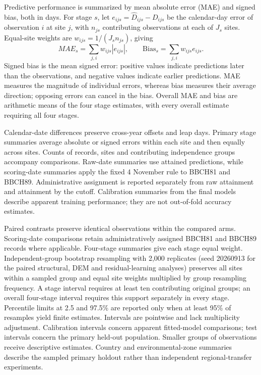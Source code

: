 \documentclass[a4paper,12pt]{article}
\begin{document}
Predictive performance is summarized by mean absolute error (MAE) and signed bias, both in days. For stage $s$, let $e_{ijs}=\widehat D_{ijs}-D_{ijs}$ be the calendar-day error of observation $i$ at site $j$, with $n_{js}$ contributing observations at each of $J_s$ sites. Equal-site weights are $w_{ijs}=1/(J_s n_{js})$, giving
\begin{equation}
MAE_s=\sum_{j,i}w_{ijs}|e_{ijs}|,\qquad
\mathrm{Bias}_s=\sum_{j,i}w_{ijs}e_{ijs}.
\label{eq:performance_metrics}
\end{equation}
Signed bias is the mean signed error: positive values indicate predictions later than the observations, and negative values indicate earlier predictions. MAE measures the magnitude of individual errors, whereas bias measures their average direction; opposing errors can cancel in the bias. Overall MAE and bias are arithmetic means of the four stage estimates, with every overall estimate requiring all four stages.

Calendar-date differences preserve cross-year offsets and leap days. Primary stage summaries average absolute or signed errors within each site and then equally across sites. Counts of records, sites and contributing independence groups accompany comparisons. Raw-date summaries use attained predictions, while scoring-date summaries apply the fixed 4 November rule to BBCH81 and BBCH89. Administrative assignment is reported separately from raw attainment and attainment by the cutoff. Calibration summaries from the final models describe apparent training performance; they are not out-of-fold accuracy estimates.

Paired contrasts preserve identical observations within the compared arms. Scoring-date comparisons retain administratively assigned BBCH81 and BBCH89 records where applicable. Four-stage summaries give each stage equal weight. Independent-group bootstrap resampling with 2,000 replicates (seed 20260913 for the paired structural, DEM and residual-learning analyses) preserves all sites within a sampled group and equal site weights multiplied by group resampling frequency. A stage interval requires at least ten contributing original groups; an overall four-stage interval requires this support separately in every stage. Percentile limits at 2.5 and 97.5\% are reported only when at least 95\% of resamples yield finite estimates. Intervals are pointwise and lack multiplicity adjustment. Calibration intervals concern apparent fitted-model comparisons; test intervals concern the primary held-out population. Smaller groups of observations receive descriptive estimates. Country and environmental-zone summaries describe the sampled primary holdout rather than independent regional-transfer experiments.
\end{document}
